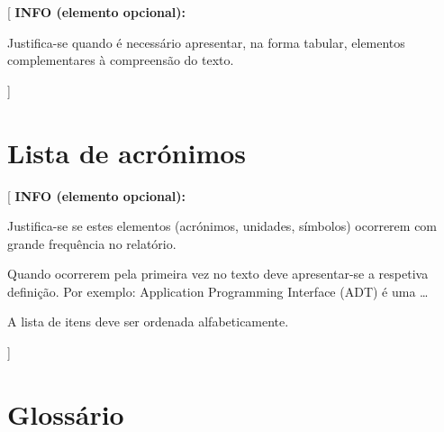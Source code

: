 \documentclass[11pt,a4paper]{report}
\newenvironment{infoopt}[1]{\vspace*{6mm}\color{blue}[ \textbf{INFO (elemento opcional):} \begin{em} #1}{\vspace*{3mm}\end{em} ]}
\begin{document}

\listoftables

\begin{infoopt}
Justifica-se quando é necessário apresentar,  na forma tabular,
elementos complementares à compreensão do texto.
\end{infoopt}


\chapter*{Lista de acrónimos}


\begin{acronym}[123456] %
\end{acronym}

\begin{infoopt}
Justifica-se se estes elementos (acrónimos, unidades, símbolos)
ocorrerem com grande frequência no relatório.

Quando ocorrerem pela primeira vez no texto deve apresentar-se a
respetiva definição.
Por exemplo: Application Programming Interface (ADT) é uma \ldots 

A lista de itens deve ser ordenada alfabeticamente.
\end{infoopt}


\chapter*{Glossário}
\end{document}
